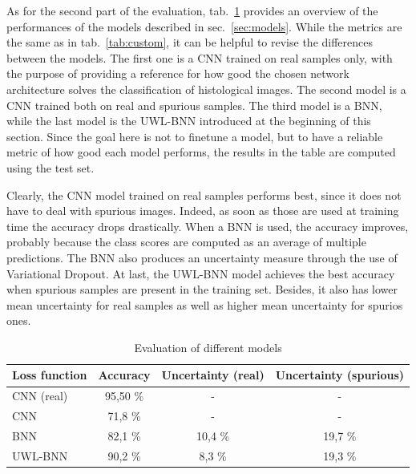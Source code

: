 \documentclass[11pt,twoside,a4paper]{article}
\begin{document}
As for the second part of the evaluation, tab.~\ref{tab:colab} provides an overview of the performances of the models described in sec.~\ref{sec:models}. While the metrics are the same as in tab.~\ref{tab:custom}, it can be helpful to revise the differences between the models. The first one is a CNN trained on real samples only, with the purpose of providing a reference for how good the chosen network architecture solves the classification of histological images. The second model is a CNN trained both on real and spurious samples. The third model is a BNN, while the last model is the UWL-BNN introduced at the beginning of this section. Since the goal here is not to finetune a model, but to have a reliable metric of how good each model performs, the results in the table are computed using the test set.

Clearly, the CNN model trained on real samples performs best, since it does not have to deal with spurious images. Indeed, as soon as those are used at training time the accuracy drops drastically. When a BNN is used, the accuracy improves, probably because the class scores are computed as an average of multiple predictions. The BNN also produces an uncertainty measure through the use of Variational Dropout. At last, the UWL-BNN model achieves the best accuracy when spurious samples are present in the training set. Besides, it also has lower mean uncertainty for real samples as well as higher mean uncertainty for spurios ones.

\begin{table}[!t]
  \begin{adjustwidth}{-.5in}{-.5in}
  \begin{center}
    \begin{tabular}{l | c | c | c}
      Loss function	& Accuracy	& Uncertainty (real)	& Uncertainty (spurious) \\
      \hline
      CNN (real)	& 95,50 \%		& - 				& - \\      
      CNN		& 71,8 \%		& - 				& - \\      
      BNN		& 82,1 \%		& 10,4 \% 			& 19,7 \% \\      
      UWL-BNN		& 90,2 \%		& 8,3  \% 			& 19,3 \% \\       
    \end{tabular}
    \caption{Evaluation of different models}
    \label{tab:colab}
  \end{center}
  \end{adjustwidth}
\end{table}
\end{document}
